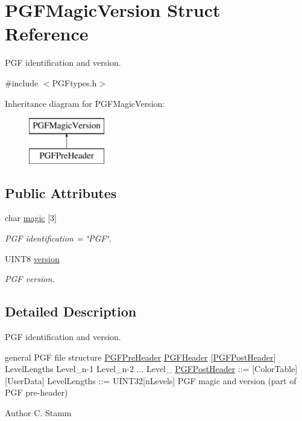 \hypertarget{structPGFMagicVersion}{}\section{P\+G\+F\+Magic\+Version Struct Reference}
\label{structPGFMagicVersion}


P\+GF identification and version.  




{\ttfamily \#include $<$P\+G\+Ftypes.\+h$>$}

Inheritance diagram for P\+G\+F\+Magic\+Version\+:\begin{figure}[H]
\begin{center}
\leavevmode
\includegraphics[height=2.000000cm]{structPGFMagicVersion}
\end{center}
\end{figure}
\subsection*{Public Attributes}
\begin{DoxyCompactItemize}
\item 
char \mbox{\hyperlink{structPGFMagicVersion_a8b27eabb723f35b4fdb9e357e69b334b}{magic}} \mbox{[}3\mbox{]}
\begin{DoxyCompactList}\small\item\em P\+GF identification = \char`\"{}\+P\+G\+F\char`\"{}. \end{DoxyCompactList}\item 
U\+I\+N\+T8 \mbox{\hyperlink{structPGFMagicVersion_aa7ff5e50537cac9dd4c62d4c8982d09d}{version}}
\begin{DoxyCompactList}\small\item\em P\+GF version. \end{DoxyCompactList}\end{DoxyCompactItemize}


\subsection{Detailed Description}
P\+GF identification and version. 

general P\+GF file structure \mbox{\hyperlink{structPGFPreHeader}{P\+G\+F\+Pre\+Header}} \mbox{\hyperlink{structPGFHeader}{P\+G\+F\+Header}} \mbox{[}\mbox{\hyperlink{structPGFPostHeader}{P\+G\+F\+Post\+Header}}\mbox{]} Level\+Lengths Level\+\_\+n-\/1 Level\+\_\+n-\/2 ... Level\+\_ \mbox{\hyperlink{structPGFPostHeader}{P\+G\+F\+Post\+Header}} \+::= \mbox{[}Color\+Table\mbox{]} \mbox{[}User\+Data\mbox{]} Level\+Lengths \+::= U\+I\+N\+T32\mbox{[}n\+Levels\mbox{]} P\+GF magic and version (part of P\+GF pre-\/header) \begin{DoxyAuthor}{Author}
C. Stamm 
\end{DoxyAuthor}


